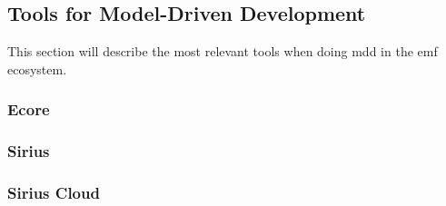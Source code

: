 \subsection{Tools for Model-Driven Development}

This section will describe the most relevant tools when doing \acrfull{mdd} in the \acrlong{emf} ecosystem.

\subsubsection{Ecore}

\subsubsection{Sirius}

\subsubsection{Sirius Cloud}

